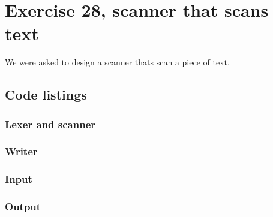 \documentclass[11pt]{article}
\begin{document}
\section*{Exercise 28, scanner that scans text}
We were asked to design a scanner thats scan a piece of text.

\subsection*{Code listings}











\subsubsection*{Lexer and scanner}



\subsubsection*{Writer}





\subsubsection*{Input}


\subsubsection*{Output}


\end{document}
